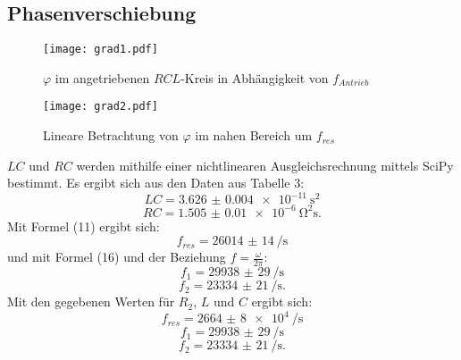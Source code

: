 \subsection{Phasenverschiebung}
\begin{figure}[H]
	\centering
	\caption{$\varphi$ im angetriebenen $RCL$-Kreis in Abhängigkeit von $f_{Antrieb}$ }
	\texttt{[image: grad1.pdf]}
	\label{fig:grad1}
\end{figure}
\begin{figure}[H]
	\centering
	\caption{Lineare Betrachtung von $\varphi$ im nahen Bereich um $f_{res}$}
	\texttt{[image: grad2.pdf]}
	\label{fig:grad2}
\end{figure}

$LC$ und $RC$ werden mithilfe einer nichtlinearen Ausgleichsrechnung mittels SciPy \cite{scipy} bestimmt. Es ergibt sich aus den Daten aus Tabelle 3:
\begin{displaymath}
LC = \SI{3.626(4)e-11}{\second\squared}
\end{displaymath}
\begin{displaymath}
RC = \SI{1.505(10)e-6}{\ohm\squared\second}\text{.}
\end{displaymath}
Mit Formel (11) ergibt sich:
\begin{displaymath}
f_{res} = \SI{26014(14)}{\per\second}
\end{displaymath}
und mit Formel (16) und der Beziehung $f = \frac{\omega}{2\pi}$:
\begin{displaymath}
f_1 = \SI{29938(29)}{\per\second}
\end{displaymath}
\begin{displaymath}
f_2 = \SI{23334(21)}{\per\second}\text{.}
\end{displaymath}
Mit den gegebenen Werten für $R_2$, $L$ und $C$ ergibt sich:
\begin{displaymath}
f_{res} = \SI{2664(8)e4}{\per\second}
\end{displaymath}
\begin{displaymath}
f_1 = \SI{29938(29)}{\per\second}
\end{displaymath}
\begin{displaymath}
f_2 = \SI{23334(21)}{\per\second}\text{.}
\end{displaymath}


